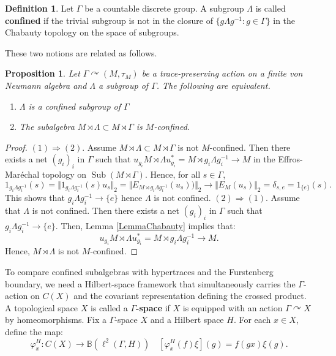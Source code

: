 \documentclass[12pt]{amsart} %
\theoremstyle{plain}
\newtheorem{proposition}[theorem]{Proposition}
\theoremstyle{definition}
\newtheorem{definition}[theorem]{Definition}
\newcommand{\Lcal}{\mathbb{B}}
\DeclareMathOperator{\Sub}{Sub}
\begin{document}
\begin{definition}
Let $\Gamma$ be a countable discrete group. A subgroup $\Lambda$ is called \textbf{confined} if the trivial subgroup is not in the closure of $\{g\Lambda g^{-1}:g\in\Gamma\}$ in the Chabauty topology on the space of subgroups.
\end{definition}
\noindent These two notions are related as follows.
\begin{proposition}\label{PropConfinedSubgroup}
Let $\Gamma \curvearrowright (M,\tau_M)$ be a trace-preserving action on a finite
von Neumann algebra and $\Lambda$ a subgroup of $\Gamma$. The following are equivalent.
\begin{enumerate}
\item $\Lambda$ is a confined subgroup of $\Gamma$
\item The subalgebra $M\rtimes\Lambda\subset M\rtimes\Gamma$ is $M$-confined.
\end{enumerate}
\end{proposition}
\begin{proof}
\noindent$(1)\Rightarrow(2)$. Assume $M\rtimes\Lambda\subset M\rtimes\Gamma$ is not $M$-confined. Then there exists
a net $(g_i)_i$ in $\Gamma$ such that $u_{g_i}M\rtimes\Lambda u_{g_i}^* = M\rtimes g_i\Lambda g_i^{-1}\longrightarrow M$
in the Effros-Mar\'echal topology on $\Sub(M\rtimes \Gamma)$. Hence, for all $s\in\Gamma$,
$$1_{g_i\Lambda g_i^{-1}}(s)=\Vert 1_{g_i\Lambda g_i^{-1}}(s)u_s\Vert_2=\Vert E_{M\rtimes g_i\Lambda g_i^{-1}}(u_s))\Vert_2\longrightarrow \Vert E_M(u_s)\Vert_2=\delta_{s,e}=1_{\{e\}}(s).$$
This shows that $g_i\Lambda g_i^{-1}\longrightarrow \{e\}$ hence $\Lambda$ is not confined.
\medskip
\noindent $(2)\Rightarrow(1).$ Assume that $\Lambda$ is not confined. Then there exists a net $(g_i)_i$ in $\Gamma$ such that $g_i\Lambda g_i^{-1}\longrightarrow \{e\}$. Then, Lemma \ref{LemmaChabauty} implies that:
$$u_{g_i}M\rtimes\Lambda u_{g_i}^*=M\rtimes g_i\Lambda g_i^{-1}\rightarrow M.$$
Hence, $M\rtimes\Lambda$ is not $M$-confined.
\end{proof}
To compare confined subalgebras with hypertraces and the Furstenberg boundary, we need a Hilbert-space framework that simultaneously carries the $\Gamma$-action on $C(X)$ and the covariant representation defining the crossed product. A topological space $X$ is called a \textbf{$\Gamma$-space} if $X$ is equipped with an action $\Gamma\curvearrowright X$ by homeomorphisms. Fix a $\Gamma$-space $X$ and a Hilbert space $H$. For each $x\in X$, define the map:
$$\varphi_x^H:C(X)\rightarrow\Lcal(\ell^2(\Gamma, H))\quad[\varphi_x^H(f)\xi](g)=f(gx)\xi(g).$$
\end{document}
